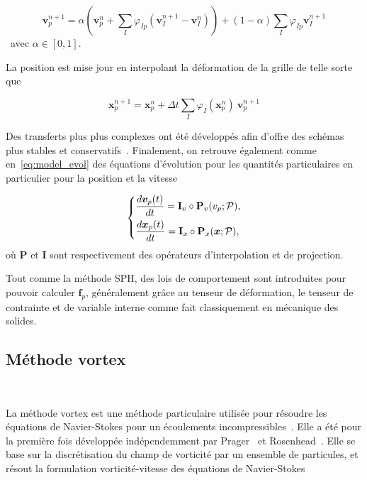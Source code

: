 \begin{equation*}
    \bm v_{p}^{n+1} = \alpha \left(\bm v_{p}^{n} + \sum_I \varphi_{Ip} (\bm v_I^{n+1} - \bm v_I^{n})\right) + (1- \alpha)\sum_I \varphi_{Ip} \bm v_I^{n+1}
\end{equation*}~avec $\alpha \in [0, 1]$.

La position est mise jour en interpolant la déformation de la grille de telle sorte que

\begin{equation*}
    \bm x_p^{n+1} = \bm x_p^{n} + \Delta t \sum_I \varphi_I(\bm x_p^n)~\bm v_p^{n+1}
\end{equation*}

Des transferts plus plus complexes ont été développés afin d'offre des schémas plus stables et conservatifs~\cite{jiang_affine_2015,fu_polynomial_2017,hu_moving_2018}. Finalement, on retrouve également comme en~\eqref{eq:model_evol} des équations d'évolution pour les quantités particulaires en particulier pour la position et la vitesse

\begin{gather}
    \left\{\begin{aligned}
         & \frac{d\bm v_p(t)}{dt} = \mathbf I_v \circ \mathbf P_v(v_p;\mathcal P), \\
         & \frac{d \bm{x}_p(t)}{d t} = \mathbf I_x \circ \mathbf P_x(\bm{x};\mathcal P),
    \end{aligned} \right.
\end{gather}où $\mathbf P$ et $\mathbf I$ sont respectivement des opérateurs d'interpolation et de projection.

Tout comme la méthode SPH, des lois de comportement sont introduites pour pouvoir calculer $\bm f_p$, généralement grâce au tenseur de déformation, le tenseur de contrainte et de variable interne comme fait classiquement en mécanique des solides.

\subsection{Méthode vortex}~\label{sec:vortex}

La méthode vortex est une méthode particulaire utilisée pour résoudre les équations de Navier-Stokes pour un écoulements incompressibles~\cite{Cottet_Koumoutsakos_2000}. Elle a été pour la première fois développée indépendemment par Prager~\cite{prager1928druckverteilung} et Rosenhead~\cite{rosenhead1931formation}. Elle se base sur la discrétisation du champ de vorticité par un ensemble de particules, et résout la formulation vorticité-vitesse des équations de Navier-Stokes


